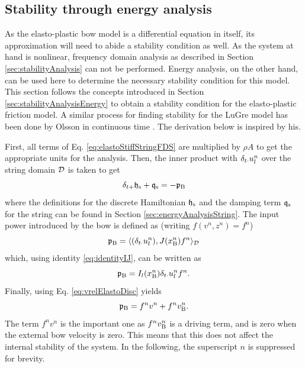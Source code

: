 \subsection{Stability through energy analysis}
As the elasto-plastic bow model is a differential equation in itself, its approximation will need to abide a stability condition as well.
As the system at hand is nonlinear, frequency domain analysis as described in Section \ref{sec:stabilityAnalysis} can not be performed. Energy analysis, on the other hand, can be used here to determine the necessary stability condition for this model. This section follows the concepts introduced in Section \ref{sec:stabilityAnalysisEnergy} to obtain a stability condition for the elasto-plastic friction model. A similar process for finding stability for the LuGre model has been done by Olsson in continuous time \cite[p. 55]{Olsson1996}. The derivation below is inspired by his. 

First, all terms of Eq. \eqref{eq:elastoStiffStringFDS} are multiplied by $\rho A$ to get the appropriate units for the analysis. Then, the inner product with $\delta_{t\cdot} u_l^n$ over the string domain $\mathcal{D}$ is taken to get
\begin{equation}
    \delta_{t+} \mathfrak{h}_\text{s} + \mathfrak{q}_\text{s} = -\mathfrak{p}_{\text{B}}
\end{equation}
where the definitions for the discrete Hamiltonian $\mathfrak{h}_\text{s}$ and the damping term $\mathfrak{q}_\text{s}$ for the string can be found in Section \ref{sec:energyAnalysisString}. The input power introduced by the bow is defined as (writing $f(v^n,z^n) = f^n$)
\begin{equation*}
    \mathfrak{p}_{\text{B}} = \langle (\delta_{t\cdot} u_l^n), J(x_{\text{B}}^n)f^n\rangle_{\mathcal{D}}
\end{equation*}
which, using identity \eqref{eq:identityIJ}, can be written as 
\begin{equation*}
    \mathfrak{p}_{\text{B}} = I_l(x_\text{B}^n)\delta_{t\cdot} u_l^n f^n.
\end{equation*}
Finally, using Eq. \eqref{eq:vrelElastoDisc} yields
\begin{equation}
    \mathfrak{p}_{\text{B}} = f^nv^n + f^n v_{\text{B}}^n.
\end{equation}
The term $f^nv^n$ is the important one as $f^nv_{\text{B}}^n$ is a driving term, and is zero when the external bow velocity is zero. This means that this does not affect the internal stability of the system. In the following, the superscript $n$ is suppressed for brevity.


